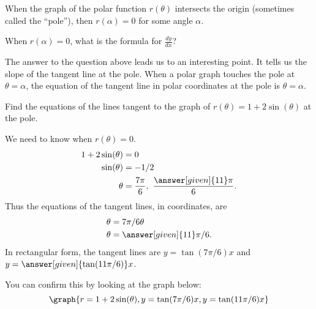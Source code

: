 \documentclass{ximera}
\begin{document}
When the graph of the polar function $r(\theta)$ intersects the origin
(sometimes called the ``pole''), then $r(\alpha)=0$ for some angle
$\alpha$.

\begin{question}
  When $r(\alpha) = 0$, what is the formula for $\frac{dy}{dx}$?
\begin{multipleChoice} 
\end{multipleChoice}
\end{question}
The answer to the question above leads us to an interesting point. It
tells us the slope of the tangent line at the pole.  When a polar
graph touches the pole at $\theta=\alpha$, the equation of the tangent
line in polar coordinates at the pole is $\theta=\alpha$.


\begin{example}
  Find the equations of the lines tangent to the graph of
  $r(\theta)=1+2\sin(\theta)$ at the pole.
  \begin{explanation}
    We need to know when $r(\theta)=0$.
    \begin{align*}
      1+2\sin(\theta) &= 0\\
      \sin(\theta) &= -1/2\\
      \theta &= \frac{7\pi}{6},\ \frac{\answer[given]{11}\pi}6.
    \end{align*}
    Thus the equations of the tangent lines, in  coordinates, are
    \begin{align*}
      \theta &=7\pi/6 \theta \\
      \theta &= \answer[given]{11}\pi/6.
    \end{align*}
    In rectangular form, the tangent lines are $y=\tan(7\pi/6)x$ and
    $y=\answer[given]{\tan(11\pi/6)}x$.
    \begin{prompt}
     You can confirm this by looking at the graph below:
     \[
     \graph{r=1+2\sin(\theta),y=\tan(7\pi/6)x,y=\tan(11\pi/6)x}
     \]
   \end{prompt}
  \end{explanation}
\end{example}
\end{document}
